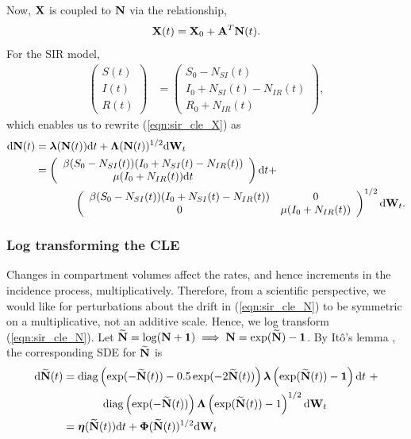 Now, $ \mathbf{X} $ is coupled to $ \mathbf{N} $ via the relationship,
\begin{equation}
\label{eqn:incid2prev}
\mathbf{X}(t) = \mathbf{X}_0 + \mathbf{A}^T\mathbf{N}(t).
\end{equation}
For the SIR model, 
\begin{align}
\left (\begin{array}{c}
S(t) \\
I(t) \\
R(t)
\end{array}\right ) &= \left (\begin{array}{c}
S_0 - N_{SI}(t) \\
I_0 + N_{SI}(t) - N_{IR}(t) \\
R_0 + N_{IR}(t)
\end{array}\right ),
\end{align}
which enables us to rewrite (\ref{eqn:sir_cle_X}) as
\begin{align}
\label{eqn:sir_cle_N}
 \mathrm{d}\mathbf{N}(t)&= \boldsymbol{\lambda}(\mathbf{N}(t))\mathrm{d} t + \boldsymbol{\Lambda}(\mathbf{N}(t))^{1/2}\mathrm{d}\mathbf{W}_t \\
 &= \left (\begin{array}{cc}
\beta (S_0 - N_{SI}(t))(I_0 + N_{SI}(t) - N_{IR}(t))\\
\mu(I_0 + N_{IR}(t))\mathrm{d} t 
\end{array}\right )\mathrm{d} t + \nonumber\\
&\hspace{0.5in}\left(\begin{array}{cc}
\beta (S_0 - N_{SI}(t))(I_0 + N_{SI}(t) - N_{IR}(t)) & 0 \\
0 & \mu(I_0 + N_{IR}(t))
\end{array}\right)^{1/2}\mathrm{d}\mathbf{W}_t. \nonumber 
\end{align}

\subsubsection{Log transforming the CLE}
\label{subsubsec:log_cle}
Changes in compartment volumes affect the rates, and hence increments in the incidence process, multiplicatively. Therefore, from a scientific perspective, we would like for perturbations about the drift in (\ref{eqn:sir_cle_N}) to be symmetric on a multiplicative, not an additive scale. Hence, we log transform (\ref{eqn:sir_cle_N}). Let $ \widetilde{\mathbf{N}} = \log(\mathbf{N} + \boldsymbol{1}) \implies\mathbf{N} = \exp(\widetilde{\mathbf{N}}) - \boldsymbol{1}$. By It\^{o}'s lemma \cite{oksendal2003stochastic}, the corresponding SDE for $ \widetilde{\mathbf{N}} $ is 
	\begin{align}
\label{eqn:sir_log_cle}
\mathrm{d}\widetilde{\mathbf{N}}(t) &= \mathrm{diag}\left (\exp(-\widetilde{\mathbf{N}}(t)) - 0.5\exp(-2\widetilde{\mathbf{N}}(t))\right )\boldsymbol{\lambda}\left (\exp(\widetilde{\mathbf{N}}(t))-\boldsymbol{1}\right )\mathrm{d} t\ + \nonumber\\
& \hspace{0.5in} \mathrm{diag}\left (\exp(-\widetilde{\mathbf{N}}(t))\right )\boldsymbol{\Lambda}\left (\exp(\widetilde{\mathbf{N}}(t))-1\right )^{1/2}\mathrm{d}\mathbf{W}_t \\
\label{eqn:sir_log_cle_gen}
&= \boldsymbol{\eta}(\widetilde{\mathbf{N}}(t))\mathrm{d} t + \boldsymbol{\Phi}(\widetilde{\mathbf{N}}(t))^{1/2}\mathrm{d}\mathbf{W}_t
\end{align}

